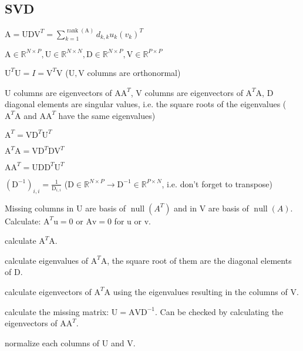 \documentclass[a4paper, 11pt, landscape]{article}
\newcommand{\matr}[1]{\boldsymbol{\mathrm{#1}}}
\begin{document}
\begin{multicols*}{3}
\section{SVD}
\begin{compactitem}
	\item $\matr{A} = \matr{U} \matr{D} \matr{V}^T = \sum_{k=1}^{\operatorname{rank}(\matr{A})} d_{k,k} u_k (v_k)^T$
	\item $\matr{A} \in \mathbb{R}^{N \times P}, \matr{U} \in \mathbb{R}^{N \times N}, \matr{D} \in \mathbb{R}^{N \times P}, \matr{V} \in \mathbb{R}^{P \times P}$
	\item $\matr{U}^T \matr{U} = I = \matr{V}^T \matr{V}$ ($\matr{U}, \matr{V}$ columns are orthonormal)
	\item $\matr{U}$ columns are eigenvectors of $\matr{A} \matr{A}^T$, $\matr{V}$ columns are eigenvectors of $\matr{A}^T \matr{A}$, $\matr{D}$ diagonal elements are singular values, i.e. the square roots of the eigenvalues ($\matr{A}^T \matr{A}$ and $\matr{A} \matr{A}^T$ have the same eigenvalues)
	\begin{listcols}
		\item $\matr{A}^T = \matr{V} \matr{D}^T \matr{U}^T$
		\item $\matr{A}^T \matr{A} = \matr{V} \matr{D}^T \matr{D} \matr{V}^T$
		\item $\matr{A} \matr{A}^T = \matr{U} \matr{D} \matr{D}^T \matr{U}^T$
	\end{listcols}
	\item $(\matr{D}^{-1})_{i,i} = \frac{1}{\matr{D}_{i, i}}$ ($\matr{D} \in \mathbb{R}^{N \times P} \to \matr{D}^{-1} \in \mathbb{R}^{P \times N}$, i.e. don't forget to transpose)
	\item Missing columns in $\matr{U}$ are basis of $\operatorname{null}(A^T)$ and in $\matr{V}$ are basis of $\operatorname{null}(A)$. Calculate: $\matr{A}^T \matr{u} = \matr{0}$ or $\matr{A} \matr{v} = \matr{0}$ for $\matr{u}$ or $\matr{v}$.
\end{compactitem}

\begin{compactenum}
	\item calculate $\matr{A}^T \matr{A}$.
	\item calculate eigenvalues of $\matr{A}^T \matr{A}$, the square root of them are the diagonal elements of $\matr{D}$.
	\item calculate eigenvectors of $\matr{A}^T \matr{A}$ using the eigenvalues resulting in the columns of $\matr{V}$.
	\item calculate the missing matrix: $\matr{U} = \matr{A} \matr{V} \matr{D}^{-1}$. Can be checked by calculating the eigenvectors of $\matr{A} \matr{A}^T$.
	\item normalize each columns of $\matr{U}$ and $\matr{V}$.
\end{compactenum}


\end{multicols*}
\end{document}
